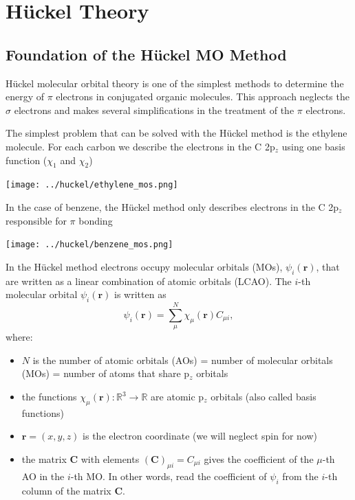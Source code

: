 \documentclass[../Main/chem532-notes.tex]{subfiles}
\begin{document}
\chapter{H\"{u}ckel Theory}

\section{Foundation of the H\"{u}ckel MO Method}
H\"{u}ckel molecular orbital theory is one of the simplest methods to determine the energy of $\pi$ electrons in conjugated organic molecules. This approach neglects the $\sigma$ electrons and makes several simplifications in the treatment of the $\pi$ electrons.

\begin{example}
The simplest problem that can be solved with the H\"{u}ckel method is the ethylene molecule. For each carbon we describe the electrons in the C 2p$_z$ using one basis function ($\chi_1$ and $\chi_2$)
\begin{center}
\texttt{[image: ../huckel/ethylene\_mos.png]}
\end{center}
\end{example}

\begin{example}
In the case of benzene, the H\"{u}ckel method only describes electrons in the C 2p$_z$ responsible for $\pi$ bonding
\begin{center}
\texttt{[image: ../huckel/benzene\_mos.png]}
\end{center}
\end{example}

In the H\"{u}ckel method electrons occupy molecular orbitals (MOs), $\psi_i(\mathbf{r})$, that are written as a linear combination of atomic orbitals (LCAO).
The $i$-th molecular orbital $\psi_i(\mathbf{r})$ is written as
\begin{equation}
\psi_i(\mathbf{r}) = \sum_\mu^{N} \chi_\mu(\mathbf{r}) C_{\mu i},
\end{equation}
where:
\begin{itemize}
\item  $N$ is the number of atomic orbitals (AOs) = number of molecular orbitals (MOs) = number of atoms that share p$_z$ orbitals
\item  the functions $\chi_\mu(\mathbf{r}): \mathbb{R}^3 \rightarrow \mathbb{R}$ are atomic p$_z$ orbitals (also called basis functions)
\item  $\mathbf{r} = (x,y,z)$ is the electron coordinate (we will neglect spin for now)
\item the matrix $\mathbf{C}$ with elements $(\mathbf{C})_{\mu i} = C_{\mu i}$ gives the coefficient of the $\mu$-th AO in the $i$-th MO. In other words, read the coefficient of $\psi_i$ from the $i$-th column of the matrix $\mathbf{C}$.
\end{itemize}
\end{document}

